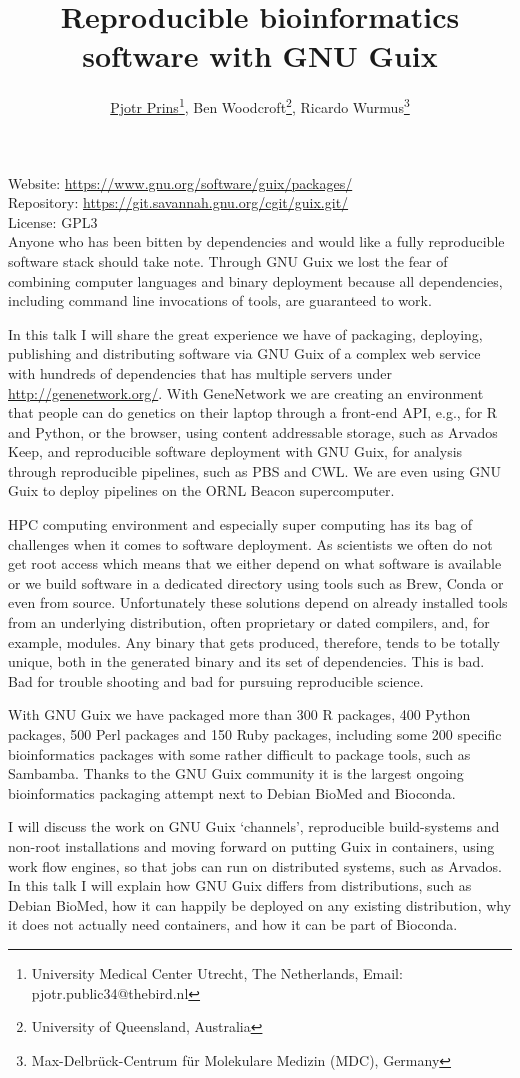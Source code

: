 \documentclass[10pt,oneside]{article}
\title{Reproducible bioinformatics software with GNU Guix}
\author{
    \underline{Pjotr Prins}\footnote{University Medical Center Utrecht, The Netherlands, Email: pjotr.public34@thebird.nl},
    Ben Woodcroft\footnote{University of Queensland, Australia},
    Ricardo Wurmus\footnote{Max-Delbr\"{u}ck-Centrum f\"{u}r Molekulare Medizin (MDC), Germany }
}
\begin{document}
\maketitle
\thispagestyle{empty}

\vspace{-0.2in}
\noindent
Website: \url{https://www.gnu.org/software/guix/packages/} \\
Repository: \url{https://git.savannah.gnu.org/cgit/guix.git/} \\
License: GPL3 \\

Anyone who has been bitten by dependencies and would like a fully
reproducible software stack should take note. Through GNU Guix we lost
the fear of combining computer languages and binary deployment because
all dependencies, including command line invocations of tools, are
guaranteed to work.

In this talk I will share the great experience we have of packaging,
deploying, publishing and distributing software via GNU Guix of a
complex web service with hundreds of dependencies that has multiple
servers under \hbox{\url{http://genenetwork.org/}}. With GeneNetwork
we are creating an environment that people can do genetics on their
laptop through a front-end API, e.g., for R and Python, or the
browser, using content addressable storage, such as Arvados Keep, and
reproducible software deployment with GNU Guix, for analysis through
reproducible pipelines, such as PBS and CWL. We are even using GNU
Guix to deploy pipelines on the ORNL Beacon supercomputer.

HPC computing environment and especially super computing has its bag
of challenges when it comes to software deployment. As scientists we
often do not get root access which means that we either depend on what
software is available or we build software in a dedicated directory
using tools such as Brew, Conda or even from source. Unfortunately
these solutions depend on already installed tools from an underlying
distribution, often proprietary or dated compilers, and, for example,
modules. Any binary that gets produced, therefore, tends to be totally
unique, both in the generated binary and its set of dependencies. This
is bad. Bad for trouble shooting and bad for pursuing reproducible
science.

With GNU Guix we have packaged more than 300 R packages, 400 Python
packages, 500 Perl packages and 150 Ruby packages, including some 200
specific bioinformatics packages with some rather difficult to package
tools, such as Sambamba. Thanks to the GNU Guix community it is the
largest ongoing bioinformatics packaging attempt next to Debian BioMed
and Bioconda.

I will discuss the work on GNU Guix `channels', reproducible
build-systems and non-root installations and moving forward on putting
Guix in containers, using work flow engines, so that jobs can run on
distributed systems, such as Arvados. In this talk I will explain how
GNU Guix differs from distributions, such as Debian BioMed, how it can
happily be deployed on any existing distribution, why it does not
actually need containers, and how it can be part of Bioconda.
\end{document}
